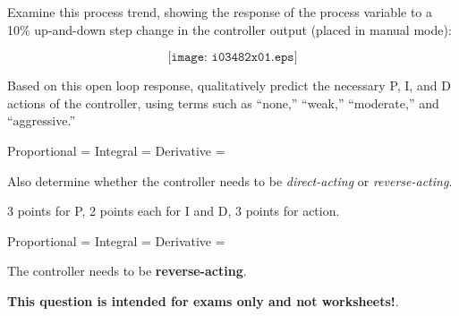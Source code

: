 

Examine this process trend, showing the response of the process variable to a 10\% up-and-down step change in the controller output (placed in manual mode):

$$\texttt{[image: i03482x01.eps]}$$

Based on this open loop response, qualitatively predict the necessary P, I, and D actions of the controller, using terms such as ``none,'' ``weak,'' ``moderate,'' and ``aggressive.''

\vskip 10pt

Proportional = \underbar{\hskip 70pt} \hskip 20pt Integral = \underbar{\hskip 70pt} \hskip 20pt Derivative = \underbar{\hskip 70pt}

\vskip 10pt

Also determine whether the controller needs to be {\it direct-acting} or {\it reverse-acting}.







3 points for P, 2 points each for I and D, 3 points for action.

\vskip 10pt

\noindent
Proportional =  \hskip 10pt Integral =  \hskip 10pt Derivative = 

\vskip 10pt

The controller needs to be {\bf reverse-acting}.







{\bf This question is intended for exams only and not worksheets!}.



